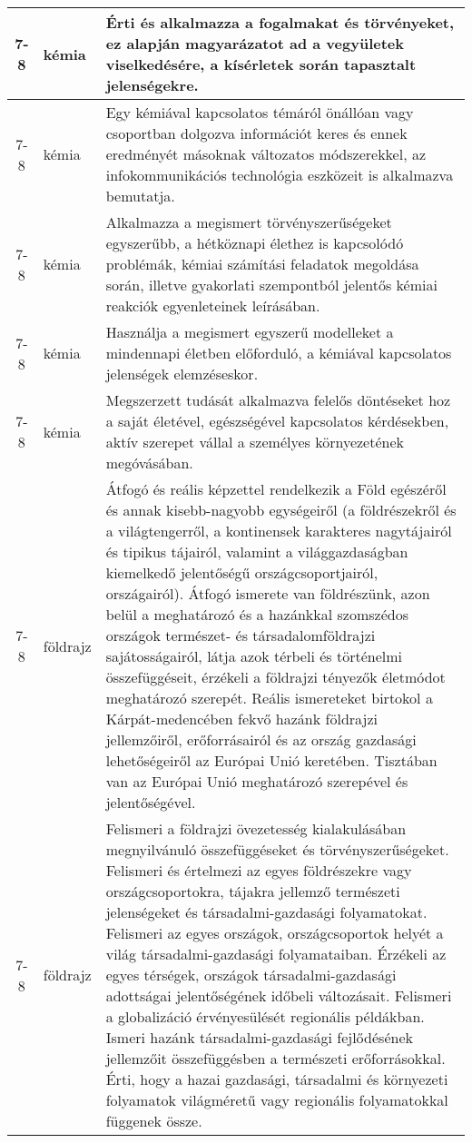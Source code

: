 \begin{small}
\begin{longtable}{c | p{2cm} |  p{11cm} }
              7-8 & kémia & Érti és alkalmazza a fogalmakat és törvényeket, ez alapján magyarázatot ad a vegyületek viselkedésére, a kísérletek során tapasztalt jelenségekre. \\ \hline
              7-8 & kémia & Egy kémiával kapcsolatos témáról önállóan vagy csoportban dolgozva információt keres és ennek eredményét másoknak változatos módszerekkel, az infokommunikációs technológia eszközeit is alkalmazva bemutatja. \\ \hline
              7-8 & kémia & Alkalmazza a megismert törvényszerűségeket egyszerűbb, a hétköznapi élethez is kapcsolódó problémák, kémiai számítási feladatok megoldása során, illetve gyakorlati szempontból jelentős kémiai reakciók egyenleteinek leírásában. \\ \hline
              7-8 & kémia & Használja a megismert egyszerű modelleket a mindennapi életben előforduló, a kémiával kapcsolatos jelenségek elemzéseskor. \\ \hline
              7-8 & kémia & Megszerzett tudását alkalmazva felelős döntéseket hoz a saját életével, egészségével kapcsolatos kérdésekben, aktív szerepet vállal a személyes környezetének megóvásában. \\ \hline
              7-8 & földrajz & Átfogó és reális képzettel rendelkezik a Föld egészéről és annak kisebb-nagyobb egységeiről (a földrészekről és a világtengerről, a kontinensek karakteres nagytájairól és tipikus tájairól, valamint a világgazdaságban kiemelkedő jelentőségű országcsoportjairól, országairól). Átfogó ismerete van földrészünk, azon belül a meghatározó és a hazánkkal szomszédos országok természet- és társadalomföldrajzi sajátosságairól, látja azok térbeli és történelmi összefüggéseit, érzékeli a földrajzi tényezők életmódot meghatározó szerepét. Reális ismereteket birtokol a Kárpát-medencében fekvő hazánk földrajzi jellemzőiről, erőforrásairól és az ország gazdasági lehetőségeiről az Európai Unió keretében. Tisztában van az Európai Unió meghatározó szerepével és jelentőségével. \\ \hline
              7-8 & földrajz & Felismeri a földrajzi övezetesség kialakulásában megnyilvánuló összefüggéseket és törvényszerűségeket. Felismeri és értelmezi az egyes földrészekre vagy országcsoportokra, tájakra jellemző természeti jelenségeket és  társadalmi-gazdasági folyamatokat. Felismeri az egyes országok, országcsoportok helyét a világ társadalmi-gazdasági folyamataiban. Érzékeli az egyes térségek, országok társadalmi-gazdasági adottságai jelentőségének időbeli változásait. Felismeri a globalizáció érvényesülését regionális példákban. Ismeri hazánk társadalmi-gazdasági fejlődésének jellemzőit összefüggésben a természeti erőforrásokkal. Érti, hogy a hazai gazdasági, társadalmi és környezeti folyamatok világméretű vagy regionális folyamatokkal függenek össze. \\ \hline

\end{longtable}
\end{small}
